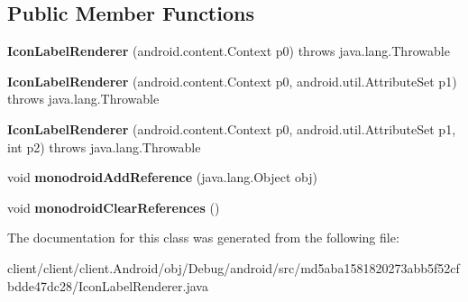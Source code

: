 \subsection*{Public Member Functions}
\begin{DoxyCompactItemize}
\item 
\hypertarget{classmd5aba1581820273abb5f52cfbdde47dc28_1_1IconLabelRenderer_aea561e7f4e4a41efbfb45e9899f37b16}{}{\bfseries Icon\+Label\+Renderer} (android.\+content.\+Context p0)  throws java.\+lang.\+Throwable 	\label{classmd5aba1581820273abb5f52cfbdde47dc28_1_1IconLabelRenderer_aea561e7f4e4a41efbfb45e9899f37b16}

\item 
\hypertarget{classmd5aba1581820273abb5f52cfbdde47dc28_1_1IconLabelRenderer_a30f8d9ed246796c2798e8e93f0eba969}{}{\bfseries Icon\+Label\+Renderer} (android.\+content.\+Context p0, android.\+util.\+Attribute\+Set p1)  throws java.\+lang.\+Throwable 	\label{classmd5aba1581820273abb5f52cfbdde47dc28_1_1IconLabelRenderer_a30f8d9ed246796c2798e8e93f0eba969}

\item 
\hypertarget{classmd5aba1581820273abb5f52cfbdde47dc28_1_1IconLabelRenderer_acca2b58a9df14e1abae19002a49fab16}{}{\bfseries Icon\+Label\+Renderer} (android.\+content.\+Context p0, android.\+util.\+Attribute\+Set p1, int p2)  throws java.\+lang.\+Throwable 	\label{classmd5aba1581820273abb5f52cfbdde47dc28_1_1IconLabelRenderer_acca2b58a9df14e1abae19002a49fab16}

\item 
\hypertarget{classmd5aba1581820273abb5f52cfbdde47dc28_1_1IconLabelRenderer_ac8bfded97144511c461509f83b0c3404}{}void {\bfseries monodroid\+Add\+Reference} (java.\+lang.\+Object obj)\label{classmd5aba1581820273abb5f52cfbdde47dc28_1_1IconLabelRenderer_ac8bfded97144511c461509f83b0c3404}

\item 
\hypertarget{classmd5aba1581820273abb5f52cfbdde47dc28_1_1IconLabelRenderer_ab963522101e24bdd09228087783dd389}{}void {\bfseries monodroid\+Clear\+References} ()\label{classmd5aba1581820273abb5f52cfbdde47dc28_1_1IconLabelRenderer_ab963522101e24bdd09228087783dd389}

\end{DoxyCompactItemize}


The documentation for this class was generated from the following file\+:\begin{DoxyCompactItemize}
\item 
client/client/client.\+Android/obj/\+Debug/android/src/md5aba1581820273abb5f52cfbdde47dc28/Icon\+Label\+Renderer.\+java\end{DoxyCompactItemize}
